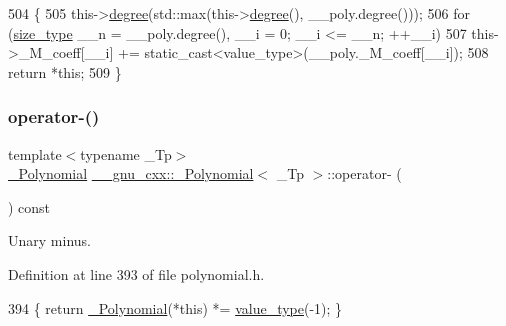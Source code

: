 \begin{DoxyCode}
504         \{
505           this->\hyperlink{class____gnu__cxx_1_1__Polynomial_a07d9933aeeb9afbd823218ed921336cb}{degree}(std::max(this->\hyperlink{class____gnu__cxx_1_1__Polynomial_a07d9933aeeb9afbd823218ed921336cb}{degree}(), \_\_poly.degree()));
506           \textcolor{keywordflow}{for} (\hyperlink{class____gnu__cxx_1_1__Polynomial_a6afe219c123c7a2fdc5abac8a6639053}{size\_type} \_\_n = \_\_poly.degree(), \_\_i = 0; \_\_i <= \_\_n; ++\_\_i)
507             this->\_M\_coeff[\_\_i] += static\_cast<value\_type>(\_\_poly.\_M\_coeff[\_\_i]);
508           \textcolor{keywordflow}{return} *\textcolor{keyword}{this};
509         \}
\end{DoxyCode}
\mbox{\label{class____gnu__cxx_1_1__Polynomial_a814ac6ceea7d2b6d42c371b4d631b47f}} 
\subsubsection{\texorpdfstring{operator-\/()}{operator-()}}
{\footnotesize\ttfamily template$<$typename \+\_\+\+Tp$>$ \\
\hyperlink{class____gnu__cxx_1_1__Polynomial}{\+\_\+\+Polynomial} \hyperlink{class____gnu__cxx_1_1__Polynomial}{\+\_\+\+\_\+gnu\+\_\+cxx\+::\+\_\+\+Polynomial}$<$ \+\_\+\+Tp $>$\+::operator-\/ (\begin{DoxyParamCaption}{ }\end{DoxyParamCaption}) const\hspace{0.3cm}{\ttfamily [inline]}}

Unary minus. 

Definition at line 393 of file polynomial.\+h.


\begin{DoxyCode}
394       \{ \textcolor{keywordflow}{return} \hyperlink{class____gnu__cxx_1_1__Polynomial_ad2baf4c12b7e3ab131a592afa3f391ae}{\_Polynomial}(*\textcolor{keyword}{this}) *= \hyperlink{class____gnu__cxx_1_1__Polynomial_a725563351f50e76084a7a016c06f8a53}{value\_type}(-1); \}
\end{DoxyCode}
\mbox{\label{class____gnu__cxx_1_1__Polynomial_a4fa6ae9adb4c4f946839d29b033ededb}} 
